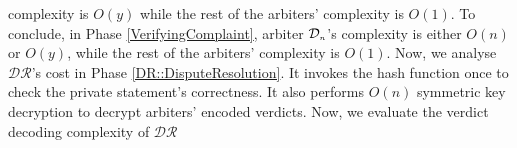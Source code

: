 complexity is $O(y)$ while the rest of the arbiters' complexity is $O(1)$. To conclude, in Phase \ref{VerifyingComplaint},  arbiter $\mathcal{D}_{\scriptscriptstyle n}$'s complexity is either $O(n)$ or $O(y)$, while the rest of  the arbiters' complexity is $O(1)$. Now, we analyse $\mathcal{DR}$'s cost in Phase \ref{DR::DisputeResolution}. It invokes the hash function once to check the private statement's correctness. It also performs $O(n)$ symmetric key decryption to decrypt arbiters' encoded verdicts. Now, we evaluate the verdict decoding complexity of $\mathcal{DR}$ 
%
%
%



